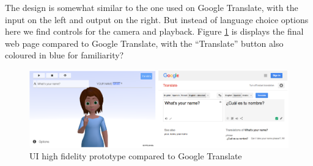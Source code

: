 \documentclass[12pt]{ociamthesis}  %
\begin{document}
The design is somewhat similar to the one used on Google Translate, with the input on the left and output on the right. But instead of language choice options here we find controls for the camera and playback. Figure \ref{fig:hifi} is displays the final web page compared to Google Translate, with the ``Translate'' button also coloured in blue for familiarity? 

\begin{figure}[h]
	\centering
    \includegraphics[scale=0.32]{chapter3/compare}
    \caption{UI high fidelity prototype compared to Google Translate}
    \label{fig:hifi}
\end{figure}
\end{document}
